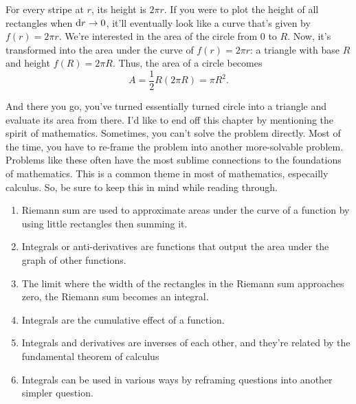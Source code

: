 For every stripe at $r$, its height is $2\pi r$. If you were to plot the height of all rectangles when $\dd{r} \rightarrow 0$, it'll eventually look like a curve that's given by $f(r) = 2\pi r$. We're interested in the area of the circle from $0$ to $R$. Now, it's transformed into the area under the curve of $f(r) = 2\pi r$: a triangle with base $R$ and height $f(R) = 2\pi R$. Thus, the area of a circle becomes
\begin{equation*}
    A = \frac{1}{2}R(2\pi R) = \pi R^2.
\end{equation*}

And there you go, you've turned essentially turned circle into a triangle and evaluate its area from there. I'd like to end off this chapter by mentioning the spirit of mathematics. Sometimes, you can't solve the problem directly. Most of the time, you have to re-frame the problem into another more-solvable problem. Problems like these often have the most sublime connections to the foundations of mathematics. This is a common theme in most of mathematics, especailly calculus. So, be sure to keep this in mind while reading through.

\conclusion

\begin{enumerate}
    \item Riemann sum are used to approximate areas under the curve of a function by using little rectangles then summing it.
    \item Integrals or anti-derivatives are functions that output the area under the graph of other functions.
    \item The limit where the width of the rectangles in the Riemann sum approaches zero, the Riemann sum becomes an integral.
    \item Integrals are the cumulative effect of a function.
    \item Integrals and derivatives are inverses of each other, and they're related by the fundamental theorem of calculus
    \item Integrals can be used in various ways by reframing questions into another simpler question.
\end{enumerate}